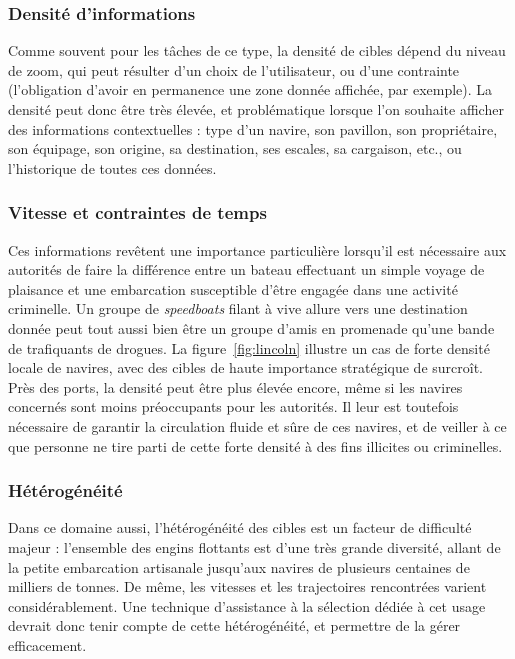 	\subsubsection{Densité d'informations}
	Comme souvent pour les tâches de ce type, la densité de cibles dépend du niveau de zoom, qui peut résulter d'un choix de l'utilisateur, ou d'une contrainte (l'obligation d'avoir en permanence une zone donnée affichée, par exemple). La densité peut donc être très élevée, et problématique lorsque l'on souhaite afficher des informations contextuelles : type d'un navire, son pavillon, son propriétaire, son équipage, son origine, sa destination, ses escales, sa cargaison, etc., ou l'historique de toutes ces données.
	
	\subsubsection{Vitesse et contraintes de temps}
	Ces informations revêtent une importance particulière lorsqu'il est nécessaire aux autorités de faire la différence entre un bateau effectuant un simple voyage de plaisance et une embarcation susceptible d'être engagée dans une activité criminelle. Un groupe de \emph{speedboats} filant à vive allure vers une destination donnée peut tout aussi bien être un groupe d'amis en promenade qu'une bande de trafiquants de drogues. La figure~\ref{fig:lincoln} illustre un cas de forte densité locale de navires, avec des cibles de haute importance stratégique de surcroît. Près des ports, la densité peut être plus élevée encore, même si les navires concernés sont moins préoccupants pour les autorités. Il leur est toutefois nécessaire de garantir la circulation fluide et sûre de ces navires, et de veiller à ce que personne ne tire parti de cette forte densité à des fins illicites ou criminelles.
	
	\subsubsection{Hétérogénéité}
	Dans ce domaine aussi, l'hétérogénéité des cibles est un facteur de difficulté majeur : l'ensemble des engins flottants est d'une très grande diversité, allant de la petite embarcation artisanale jusqu'aux navires de plusieurs centaines de milliers de tonnes. De même, les vitesses et les trajectoires rencontrées varient considérablement. Une technique d'assistance à la sélection dédiée à cet usage devrait donc tenir compte de cette hétérogénéité, et permettre de la gérer efficacement.
	
